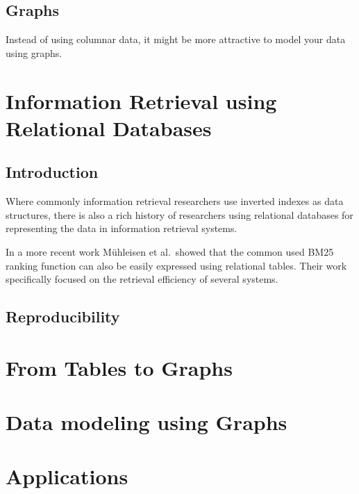 \documentclass{tufte-book} %
\begin{document}
\section{Graphs}
Instead of using columnar data, it might be more attractive to model your data using graphs. 


\chapter{Information Retrieval using Relational Databases}
\section{Introduction}
Where commonly information retrieval researchers use inverted indexes as data structures, there is also a rich history of researchers using relational databases for representing the data in information retrieval systems. 


In a more recent work M\"{u}hleisen et al.~showed that the common used BM25 ranking function can also be easily expressed using relational tables. Their work specifically focused on the retrieval efficiency of several systems.   

\section{Reproducibility}


\chapter{From Tables to Graphs}


\chapter{Data modeling using Graphs}

\chapter{Applications}
\end{document}
